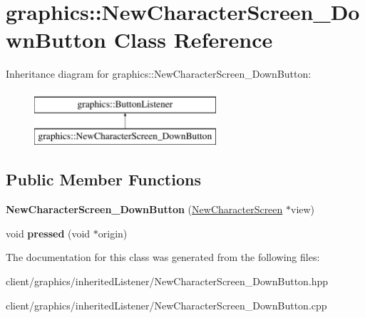 \hypertarget{classgraphics_1_1_new_character_screen___down_button}{\section{graphics\-:\-:New\-Character\-Screen\-\_\-\-Down\-Button Class Reference}
\label{classgraphics_1_1_new_character_screen___down_button}
}
Inheritance diagram for graphics\-:\-:New\-Character\-Screen\-\_\-\-Down\-Button\-:\begin{figure}[H]
\begin{center}
\leavevmode
\includegraphics[height=2.000000cm]{classgraphics_1_1_new_character_screen___down_button}
\end{center}
\end{figure}
\subsection*{Public Member Functions}
\begin{DoxyCompactItemize}
\item 
\hypertarget{classgraphics_1_1_new_character_screen___down_button_aa13428611c78e8764aa2891213f84963}{{\bfseries New\-Character\-Screen\-\_\-\-Down\-Button} (\hyperlink{classgraphics_1_1_new_character_screen}{New\-Character\-Screen} $\ast$view)}\label{classgraphics_1_1_new_character_screen___down_button_aa13428611c78e8764aa2891213f84963}

\item 
\hypertarget{classgraphics_1_1_new_character_screen___down_button_a97db148b0299111dd06891ae71e964cf}{void {\bfseries pressed} (void $\ast$origin)}\label{classgraphics_1_1_new_character_screen___down_button_a97db148b0299111dd06891ae71e964cf}

\end{DoxyCompactItemize}


The documentation for this class was generated from the following files\-:\begin{DoxyCompactItemize}
\item 
client/graphics/inherited\-Listener/New\-Character\-Screen\-\_\-\-Down\-Button.\-hpp\item 
client/graphics/inherited\-Listener/New\-Character\-Screen\-\_\-\-Down\-Button.\-cpp\end{DoxyCompactItemize}
